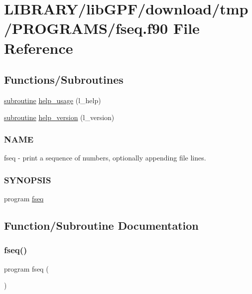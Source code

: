 \hypertarget{fseq_8f90}{}\section{L\+I\+B\+R\+A\+R\+Y/lib\+G\+P\+F/download/tmp/\+P\+R\+O\+G\+R\+A\+M\+S/fseq.f90 File Reference}
\label{fseq_8f90}
\subsection*{Functions/\+Subroutines}
\begin{DoxyCompactItemize}
\item 
\hyperlink{M__stopwatch_83_8txt_acfbcff50169d691ff02d4a123ed70482}{subroutine} \hyperlink{fseq_8f90_a3e09a3b52ee8fb04eeb93fe5761626a8}{help\+\_\+usage} (l\+\_\+help)
\item 
\hyperlink{M__stopwatch_83_8txt_acfbcff50169d691ff02d4a123ed70482}{subroutine} \hyperlink{fseq_8f90_a39c21619b08a3c22f19e2306efd7f766}{help\+\_\+version} (l\+\_\+version)
\begin{DoxyCompactList}\small\item\em \subsubsection*{N\+A\+ME}

fseq -\/ print a sequence of numbers, optionally appending file lines. \subsubsection*{S\+Y\+N\+O\+P\+S\+IS}\end{DoxyCompactList}\item 
program \hyperlink{fseq_8f90_af3934bd2dae2aeb0d214ae4aa8aeecb7}{fseq}
\end{DoxyCompactItemize}


\subsection{Function/\+Subroutine Documentation}
\mbox{\label{fseq_8f90_af3934bd2dae2aeb0d214ae4aa8aeecb7}} 
\subsubsection{\texorpdfstring{fseq()}{fseq()}}
{\footnotesize\ttfamily program fseq (\begin{DoxyParamCaption}{ }\end{DoxyParamCaption})}



